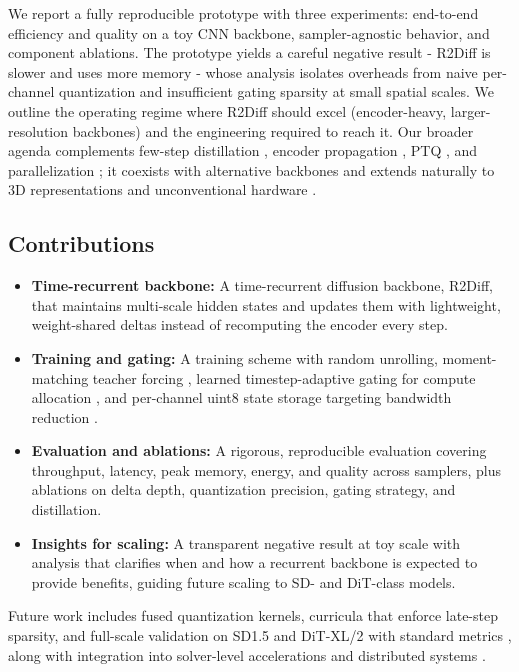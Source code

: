 \documentclass{article}
\begin{document}
We report a fully reproducible prototype with three experiments: end-to-end efficiency and quality on a toy CNN backbone, sampler-agnostic behavior, and component ablations. The prototype yields a careful negative result - R2Diff is slower and uses more memory - whose analysis isolates overheads from naive per-channel quantization and insufficient gating sparsity at small spatial scales. We outline the operating regime where R2Diff should excel (encoder-heavy, larger-resolution backbones) and the engineering required to reach it. Our broader agenda complements few-step distillation \cite{salimans-2024-multistep}, encoder propagation \cite{li-2023-faster}, PTQ \cite{shang-2022-post}, and parallelization \cite{li-2024-distrifusion}; it coexists with alternative backbones \cite{yan-2023-diffusion,phung-2022-wavelet} and extends naturally to 3D representations \cite{shue-2022-neural,anciukeviius-2024-denoising} and unconventional hardware \cite{oguz-2024-optical}.

\subsection{Contributions}
\begin{itemize}
  \item \textbf{Time-recurrent backbone:} A time-recurrent diffusion backbone, R2Diff, that maintains multi-scale hidden states and updates them with lightweight, weight-shared deltas instead of recomputing the encoder every step.
  \item \textbf{Training and gating:} A training scheme with random unrolling, moment-matching teacher forcing \cite{salimans-2024-multistep}, learned timestep-adaptive gating for compute allocation \cite{moon-2024-simple}, and per-channel uint8 state storage targeting bandwidth reduction \cite{shang-2022-post}.
  \item \textbf{Evaluation and ablations:} A rigorous, reproducible evaluation covering throughput, latency, peak memory, energy, and quality across samplers, plus ablations on delta depth, quantization precision, gating strategy, and distillation.
  \item \textbf{Insights for scaling:} A transparent negative result at toy scale with analysis that clarifies when and how a recurrent backbone is expected to provide benefits, guiding future scaling to SD- and DiT-class models.
\end{itemize}

Future work includes fused quantization kernels, curricula that enforce late-step sparsity, and full-scale validation on SD1.5 and DiT-XL/2 with standard metrics \cite{karras-2023-analyzing,li-2023-snapfusion}, along with integration into solver-level accelerations \cite{huang-2024-reverse} and distributed systems \cite{li-2024-distrifusion}.
\end{document}
